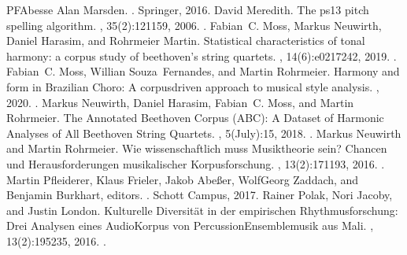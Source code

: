\documentclass[letterpaper,10pt,english]{sphinxmanual}
\begin{document}
\begin{sphinxthebibliography}{PFAbesse}
Alan Marsden. . Springer, 2016.
David Meredith. The ps13 pitch spelling algorithm. , 35(2):121\textendash{}159, 2006. .
Fabian C. Moss, Markus Neuwirth, Daniel Harasim, and Rohrmeier Martin. Statistical characteristics of tonal harmony: a corpus study of beethoven’s string quartets. , 14(6):e0217242, 2019. .
Fabian C. Moss, Willian Souza Fernandes, and Martin Rohrmeier. Harmony and form in Brazilian Choro: A corpus\sphinxhyphen{}driven approach to musical style analysis. , 2020. .
Markus Neuwirth, Daniel Harasim, Fabian C. Moss, and Martin Rohrmeier. The Annotated Beethoven Corpus (ABC): A Dataset of Harmonic Analyses of All Beethoven String Quartets. , 5(July):1\textendash{}5, 2018. .
Markus Neuwirth and Martin Rohrmeier. Wie wissenschaftlich muss Musiktheorie sein? Chancen und Herausforderungen musikalischer Korpusforschung. , 13(2):171\textendash{}193, 2016. .
Martin Pfleiderer, Klaus Frieler, Jakob Abeßer, Wolf\sphinxhyphen{}Georg Zaddach, and Benjamin Burkhart, editors. . Schott Campus, 2017.
Rainer Polak, Nori Jacoby, and Justin London. Kulturelle Diversität in der empirischen Rhythmusforschung: Drei Analysen eines Audio\sphinxhyphen{}Korpus von Percussion\sphinxhyphen{}Ensemblemusik aus Mali. , 13(2):195\textendash{}235, 2016. .

\end{sphinxthebibliography}
\end{document}
